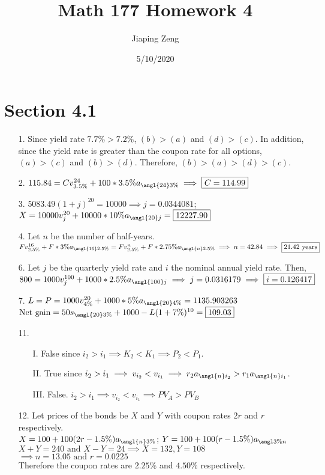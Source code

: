 \documentclass{article}
\title{Math 177 Homework 4}
\date{5/10/2020}
\author{Jiaping Zeng}
\begin{document}
\maketitle

\section*{Section 4.1}
\begin{itemize}
	\item [1.] Since yield rate $7.7\%>7.2\%$, $(b)>(a)$ and $(d)>(c)$. In addition, since the yield rate is greater than the coupon rate for all options, $(a)>(c)$ and $(b)>(d)$. Therefore, $(b)>(a)>(d)>(c)$.
	\item [2.] $115.84=Cv_{3.5\%}^{24}+100*3.5\%a_{\angl{24}3\%} \implies \boxed{C=114.99}$
	\item [3.] $5083.49(1+j)^{20}=10000 \implies j=0.0344081$; $X=10000v_j^{20}+10000*10\%a_{\angl{20}j}=\boxed{12227.90}$
	\item [4.] Let $n$ be the number of half-years. $Fv_{2.5\%}^{16}+F*3\%a_{\angl{16}2.5\%}=Fv_{2.5\%}^n+F*2.75\%a_{\angl{n}2.5\%} \implies n=42.84 \implies \boxed{21.42\text{ years}}$
	\item [6.] Let $j$ be the quarterly yield rate and $i$ the nominal annual yield rate. Then, $800=1000v_j^{100}+1000*2.5\%a_{\angl{100}j} \implies j=0.0316179 \implies \boxed{i=0.126417}$
	\item [7.] $L=P=1000v_{4\%}^{20}+1000*5\%a_{\angl{20}4\%}=1135.903263$\\$\text{Net gain}=50s_{\angl{20}3\%}+1000-L(1+7\%)^{10}=\boxed{109.03}$
	\item [11.]
	      \begin{itemize}
		      \item [I.] False since $i_2>i_1 \implies K_2<K_1 \implies P_2<P_1$.
		      \item [II.] True since $i_2>i_1 \implies v_{i_2}<v_{i_1} \implies r_2a_{\angl{n}i_2}>r_1a_{\angl{n}i_1}$.
		      \item [III.] False. $i_2>i_1 \implies v_{i_2}<v_{i_1} \implies PV_A > PV_B$
	      \end{itemize}
	\item [12.] Let prices of the bonds be $X$ and $Y$ with coupon rates $2r$ and $r$ respectively.\\$X=100+100(2r-1.5\%)a_{\angl{n}3\%}$; $Y=100+100(r-1.5\%)a_{\angl{3\%}n}$\\$X+Y=240 \text{ and } X-Y=24 \implies X=132, Y=108$\\$\implies n=13.05 \text{ and } r=0.0225$\\Therefore the coupon rates are $2.25\%$ and $4.50\%$ respectively.

\end{itemize}
\end{document}
